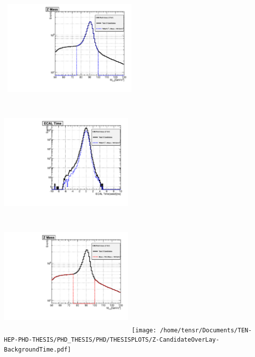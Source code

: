 \paragraph*{}\mbox{}\\
\begin{minipage}{\linewidth} 
\begin{center}
\centering
\mbox{
\includegraphics[height=6cm, width=0.5\textwidth]{THESISPLOTS/Z-CandidateOverLay-SignalMass.pdf}
\includegraphics[height=6cm, width=0.5\textwidth]{THESISPLOTS/Z-CandidateOverLay-SignalTime.pdf}}
\mbox{
\includegraphics[height=6cm, width=0.5\textwidth]{THESISPLOTS/Z-CandidateOverLay-BackgroundMass.pdf}
\texttt{[image: /home/tensr/Documents/TEN-HEP-PHD-THESIS/PHD\_THESIS/PHD/THESISPLOTS/Z-CandidateOverLay-BackgroundTime.pdf]}}
\label{fig:Zmass}
\end{center}
\end{minipage}

